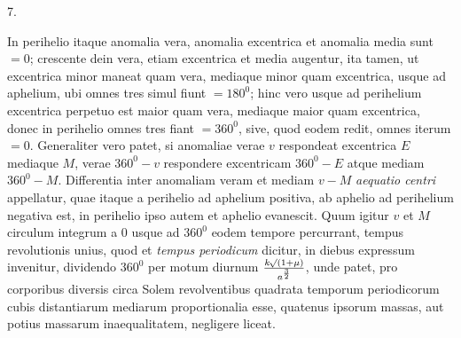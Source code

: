 \begin{center}
7.
\end{center}
In perihelio itaque anomalia vera, anomalia excentrica et anomalia media sunt $= 0$;
crescente dein vera, etiam excentrica et media augentur, ita tamen, ut excentrica minor
maneat quam vera, mediaque minor quam excentrica, usque ad aphelium, ubi omnes tres
simul fiunt $= 180^0$; hinc vero usque ad perihelium excentrica perpetuo est maior quam
vera, mediaque maior quam excentrica, donec in perihelio omnes tres fiant $= 360^0$, sive,
quod eodem redit, omnes iterum $= 0$. Generaliter vero patet, si anomaliae verae $v$
respondeat excentrica $E$ mediaque $M$, verae $360^0-v$ respondere excentricam $360^0-E$
atque mediam $360^0-M$. Differentia inter anomaliam veram et mediam $v-M$ \emph{aequatio
centri} appellatur, quae itaque a perihelio ad aphelium positiva, ab aphelio ad
perihelium negativa est, in perihelio ipso autem et aphelio evanescit. Quum igitur $v$ et
$M$ circulum integrum a $0$ usque ad $360^0$ eodem tempore percurrant, tempus revolutionis
unius, quod et \emph{tempus periodicum} dicitur, in diebus expressum invenitur, dividendo
$360^0$ per motum diurnum $\frac{k\mathord{{}^{}\!\surd}(1+\mu)}{a^{\frac{3}{2}}}$, unde patet, pro
corporibus diversis circa Solem revolventibus quadrata temporum periodicorum cubis
distantiarum mediarum proportionalia esse, quatenus ipsorum massas, aut potius massarum
inaequalitatem, negligere liceat.
